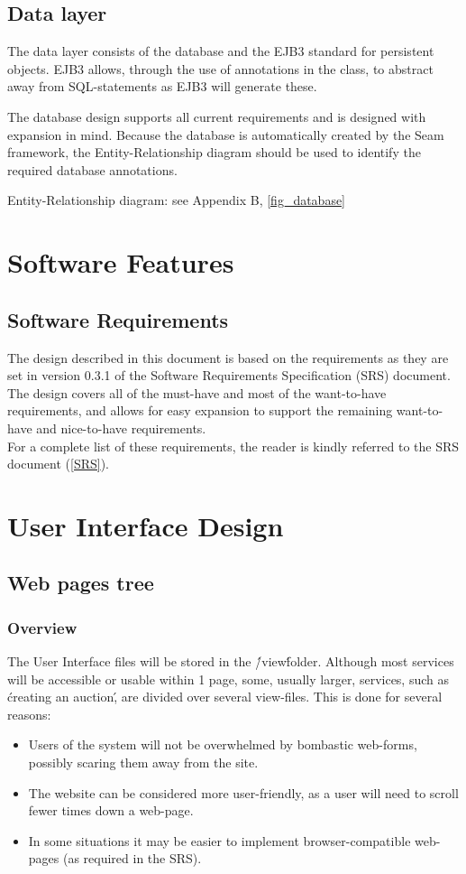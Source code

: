 \documentclass[salesmen, twoside]{../../../templates/latex/2009/softproj}
\begin{document}
\begin{projdoc}
\section{Data layer}
The data layer consists of the database and the EJB3 standard for persistent objects. EJB3 allows, through the use of annotations in the class, to abstract away from SQL-statements as EJB3 will generate these.

The database design supports all current requirements and is designed with expansion in mind. Because the database is automatically created by the Seam framework, the Entity-Relationship diagram should be used to identify the required database annotations.

Entity-Relationship diagram: see Appendix B, \ref{fig_database}

\chapter{Software Features}
\section {Software Requirements}
The design described in this document is based on the requirements as they are set in version 0.3.1 of the Software Requirements Specification (SRS) document.
The design covers all of the must-have and most of the want-to-have requirements, and allows for easy expansion to support the remaining want-to-have and nice-to-have requirements.\\
For a complete list of these requirements, the reader is kindly referred to the SRS document (\ref{SRS}).

\chapter{User Interface Design \label{UI Design}}
\section{Web pages tree}
\subsection{Overview}
The User Interface files will be stored in the \'/view\' folder. Although most services will be accessible or usable within 1 page, some, usually larger, services, such as \'creating an auction\', are divided over several view-files. This is done for several reasons:
\begin{itemize}
\item Users of the system will not be overwhelmed by bombastic web-forms, possibly scaring them away from the site.
\item The website can be considered more user-friendly, as a user will need to scroll fewer times down a web-page.
\item In some situations it may be easier to implement browser-compatible web-pages (as required in the SRS).
\end{itemize}


\end{projdoc}
\end{document}
